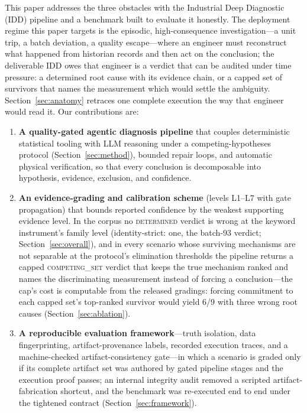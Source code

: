 \documentclass[preprint,10pt]{elsarticle}
\begin{document}
This paper addresses the three obstacles with the Industrial Deep Diagnostic (IDD) pipeline and a benchmark built to evaluate it honestly. The deployment regime this paper targets is the episodic, high-consequence investigation---a unit trip, a batch deviation, a quality escape---where an engineer must reconstruct what happened from historian records and then act on the conclusion; the deliverable IDD owes that engineer is a verdict that can be audited under time pressure: a determined root cause with its evidence chain, or a capped set of survivors that names the measurement which would settle the ambiguity. Section~\ref{sec:anatomy} retraces one complete execution the way that engineer would read it. Our contributions are:

\begin{enumerate}
\item \textbf{A quality-gated agentic diagnosis pipeline} that couples deterministic statistical tooling with LLM reasoning under a competing-hypotheses protocol (Section~\ref{sec:method}), bounded repair loops, and automatic physical verification, so that every conclusion is decomposable into hypothesis, evidence, exclusion, and confidence.
\item \textbf{An evidence-grading and calibration scheme} (levels L1--L7 with gate propagation) that bounds reported confidence by the weakest supporting evidence level. In the corpus no \mbox{\textsc{determined}} verdict is wrong at the keyword instrument's family level (identity-strict: one, the batch-93 verdict; Section~\ref{sec:overall}), and in every scenario whose surviving mechanisms are not separable at the protocol's elimination thresholds the pipeline returns a capped \mbox{\textsc{competing\_set}} verdict that keeps the true mechanism ranked and names the discriminating measurement instead of forcing a conclusion---the cap's cost is computable from the released gradings: forcing commitment to each capped set's top-ranked survivor would yield 6/9 with three wrong root causes (Section~\ref{sec:ablation}).
\item \textbf{A reproducible evaluation framework}---truth isolation, data fingerprinting, artifact-provenance labels, recorded execution traces, and a machine-checked artifact-consistency gate---in which a scenario is graded only if its complete artifact set was authored by gated pipeline stages and the execution proof passes; an internal integrity audit removed a scripted artifact-fabrication shortcut, and the benchmark was re-executed end to end under the tightened contract (Section~\ref{sec:framework}).

\end{enumerate}
\end{document}

